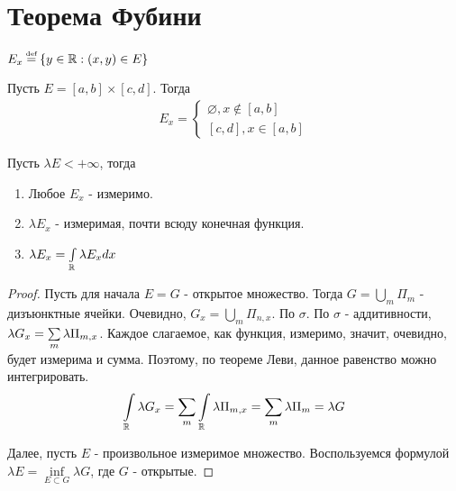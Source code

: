 \section{Теорема Фубини}

\begin{definition}
    $E_x \defeq \set{y \in \mathbb{R} : (x, y) \in E}$
\end{definition}

\begin{example}
    Пусть $E = [a, b] \times [c, d]$. Тогда 
    \begin{gather*}
        E_x = 
        \left\{ \begin{matrix}
                \varnothing, x \notin [a,b] 
                \\ 
                [c, d], x \in [a, b]
        \end{matrix}\right.
    \end{gather*}
\end{example}

\begin{theorem}
    Пусть $\lambda E < +\infty$, тогда
    \begin{enumerate}
        \item 
            Любое $E_x$ - измеримо.
        \item
            $\lambda E_x$ - измеримая, почти всюду конечная функция. 
        \item
            $\lambda E_x = \int\limits_{\mathbb{R}} \lambda E_x dx$
    \end{enumerate}
\end{theorem}

\begin{proof}
    Пусть для начала $E = G$ - открытое множество. Тогда $G = \bigcup\limits_{m} \Pi_m$ - дизъюнктные ячейки. 
    Очевидно, $G_x = \bigcup\limits_{m} \Pi_{n, x}$. По $\sigma$. По $\sigma$ - аддитивности, $\lambda G_x = \sum\limits_{m}\lambda \Pi_{m, x}$.
    Каждое слагаемое, как функция, измеримо, значит, очевидно, будет измерима и сумма. 
    Поэтому, по теореме Леви, данное равенство можно интегрировать. 
    \begin{gather*}
        \int\limits_{\mathbb{R}} \lambda G_x = \sum\limits_{m} \int\limits_{\mathbb{R}} \lambda \Pi_{m ,x} = \sum\limits_{m} \lambda \Pi_m = \lambda G
    \end{gather*}

    Далее, пусть $E$ - произвольное измеримое множество. Воспользуемся формулой $\lambda E = \inf\limits_{E \subset G} \lambda G$, где $G$ - открытые.
    \todo
\end{proof}


